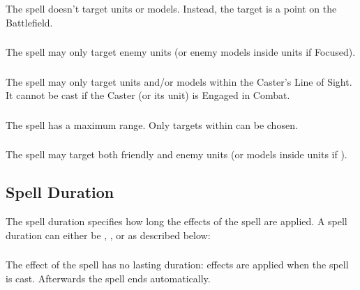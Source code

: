 \subsubsection{\ground}

The spell doesn't target units or models. Instead, the target is a point on the Battlefield.

\subsubsection{\hex}

The spell may only target enemy units (or enemy models inside units if Focused).

\subsubsection{\missile}

The spell may only target units and/or models within the Caster's Line of Sight. It cannot be cast if the Caster (or its unit) is Engaged in Combat.

\subsubsection{}

The spell has a maximum range. Only targets within  can be chosen.

\subsubsection{\universal}

The spell may target both friendly and enemy units (or models inside units if \focused{}).

\subsection{Spell Duration}

The spell duration specifies how long the effects of the spell are applied. A spell duration can either be \instant{}, \lastsoneturn{}, or \permanent{} as described below:

\subsubsection{\instant}

The effect of the spell has no lasting duration: effects are applied when the spell is cast. Afterwards the spell ends automatically.

